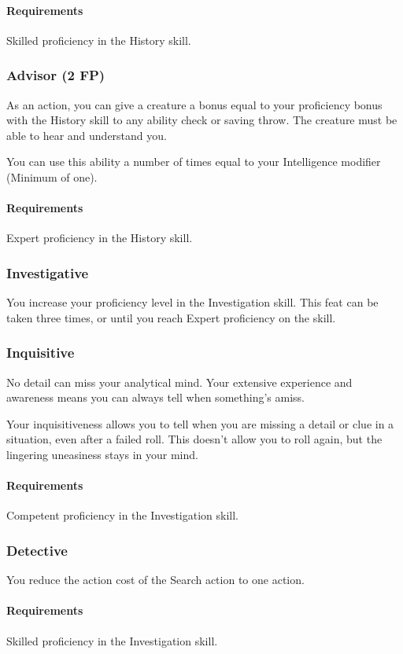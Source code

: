     \paragraph{Requirements} Skilled proficiency in the History skill.
\subsubsection{Advisor (2 FP)} \label{feat::advisor}
    As an action, you can give a creature a bonus equal to your proficiency bonus with the History skill to any ability check or saving throw.
    The creature must be able to hear and understand you.

    You can use this ability a number of times equal to your Intelligence modifier (Minimum of one).
    \paragraph{Requirements} Expert proficiency in the History skill.
\subsubsection{Investigative} \label{feat::investigative}
    You increase your proficiency level in the Investigation skill.
    This feat can be taken three times, or until you reach Expert proficiency on the skill.
\subsubsection{Inquisitive} \label{feat::inquisitive}
    No detail can miss your analytical mind.
    Your extensive experience and awareness means you can always tell when something's amiss.

    Your inquisitiveness allows you to tell when you are missing a detail or clue in a situation, even after a failed roll.
    This doesn't allow you to roll again, but the lingering uneasiness stays in your mind.
    \paragraph{Requirements} Competent proficiency in the Investigation skill.
\subsubsection{Detective} \label{feat::detective}
    You reduce the action cost of the Search action to one action.
    \paragraph{Requirements} Skilled proficiency in the Investigation skill.
